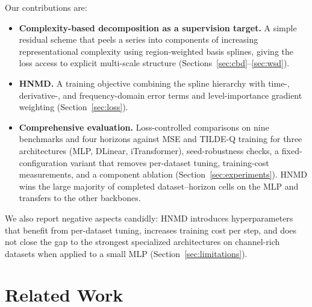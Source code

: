 \documentclass[11pt,twocolumn]{article}
\newcommand{\methodName}{HNMD\xspace}
\begin{document}
Our contributions are:
\begin{itemize}
    \item \textbf{Complexity-based decomposition as a supervision target.} A simple residual scheme that peels a series into components of increasing representational complexity using region-weighted basis splines, giving the loss access to explicit multi-scale structure (Sections~\ref{sec:cbd}--\ref{sec:wsd}).
    \item \textbf{\methodName.} A training objective combining the spline hierarchy with time-, derivative-, and frequency-domain error terms and level-importance gradient weighting (Section~\ref{sec:loss}).
    \item \textbf{Comprehensive evaluation.} Loss-controlled comparisons on nine benchmarks and four horizons against MSE and TILDE-Q training for three architectures (MLP, DLinear, iTransformer), seed-robustness checks, a fixed-configuration variant that removes per-dataset tuning, training-cost measurements, and a component ablation (Section~\ref{sec:experiments}). \methodName wins the large majority of completed dataset--horizon cells on the MLP and transfers to the other backbones.
\end{itemize}

We also report negative aspects candidly: \methodName introduces hyperparameters that benefit from per-dataset tuning, increases training cost per step, and does not close the gap to the strongest specialized architectures on channel-rich datasets when applied to a small MLP (Section~\ref{sec:limitations}).

\section{Related Work}
\label{sec:related}
\end{document}
